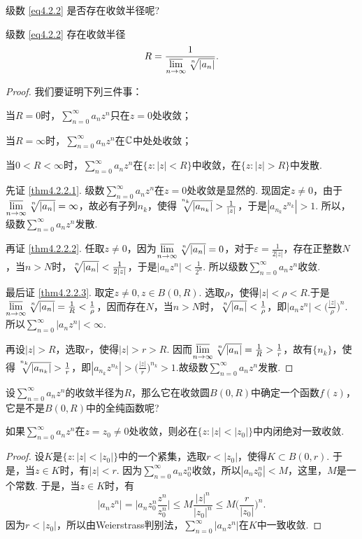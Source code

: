 级数 \eqref{eq4.2.2} 是否存在收敛半径呢?
\begin{theorem}\label{thm4.2.2}
级数  \eqref{eq4.2.2} 存在收敛半径
\[R=\frac1{\varlimsup\limits_{n\to\infty}\sqrt[\leftroot{-1}\uproot{2}n]{|a_n|}}.\]
\end{theorem}
\begin{proof}
我们要证明下列三件事：
\begin{eenum}
  \item \label{thm4.2.2.1}当$R=0$时，$\sum_{n=0}^\infty a_nz^n$只在$z=0$处收敛；
  \item \label{thm4.2.2.2}当$R=\infty$时，$\sum_{n=0}^\infty a_nz^n$在$\mathbb C$中处处收敛；
  \item \label{thm4.2.2.3}当$0<R<\infty$时，$\sum_{n=0}^\infty a_nz^n$在$\{z:|z|<R\}$中收敛，在$\{z:|z|>R\}$中发散.
\end{eenum}

先证 \ref{thm4.2.2.1}. 级数$\sum_{n=0}^\infty a_nz^n$在$z=0$处收敛是显然的. 现固定$z\ne0$，由于$\varlimsup\limits_{n\to\infty}\sqrt[\leftroot{-1}\uproot{2}n]{|a_n|}=\infty$，故必有子列$n_k$，使得$
\sqrt[\leftroot{-3}\uproot{8}n_k]{|a_{n_k}|}>\frac1{|z|}$，于是$|a_{n_k}z^{n_k}|>1$. 所以，级数$\sum_{n=0}^\infty a_nz^n$发散.

再证 \ref{thm4.2.2.2}. 任取$z\ne0$，因为$\varlimsup\limits_ {n\to\infty}\sqrt[\leftroot{-1}\uproot{2}n]{|a_n|}=0$，对于$\varepsilon=\frac1{2|z|}$，存在正整数$N$，当$n>N$时，$\sqrt[\leftroot{-1}\uproot{2}n]{|a_n|}<\frac1{2|z|}$，于是$|a_nz^n|<\frac1{2^n}$. 所以级数$\sum_{n=0}^\infty a_nz^n$收敛.

最后证 \ref{thm4.2.2.3}. 取定$z\ne0,z\in B(0,R)$. 选取$\rho$，使得$|z|<\rho<R$.于是
$\varlimsup\limits_ {n\to\infty}\sqrt[\leftroot{-1}\uproot{2}n]{|a_n|}=\frac1R<\frac1\rho$，因而存在$N$，当$n>N$时，$\sqrt[\leftroot{-1}\uproot{2}n]{|a_n|}<\frac1\rho$，即$|a_nz^n|<\bigg(
\frac{|z|}\rho\bigg)^n$. 所以$\sum_{n=0}^\infty|a_nz^n|<\infty$.

再设$|z|>R$，选取$r$，使得$|z|>r>R$. 因而$\varlimsup\limits_ {n\to\infty}\sqrt[\leftroot{-1}\uproot{2}n]{|a_n|}=\frac1R>\frac1r$，故有$\{n_k\}$，使得$
\sqrt[\leftroot{-3}\uproot{8}n_k]{|a_{n_k}|}>\frac1r$，即$|a_{n_k}z^{n_k}|>\bigg(\frac{|z|}r\bigg)^{n_k}>1$.故级数$\sum_{n=0}^\infty a_nz^n$发散.
\end{proof}

设$\sum_{n=0}^\infty a_nz^n$的收敛半径为$R$，那么它在收敛圆$B(0,R)$中确定一个函数$f(z)$，它是不是$B(0,R)$中的全纯函数呢?
\begin{theorem}\label{thm4.2.3}
如果$\sum_{n=0}^\infty a_nz^n$在$z=z_0\ne0$处收敛，则必在$\{z:|z|<|z_0|\}$中内闭绝对一致收敛.
\end{theorem}
\begin{proof}
设$K$是$\{z:|z|<|z_0|\}$中的一个紧集，选取$r<|z_0|$，使得$K\subset B(0,r)$. 于是，当$z\in K$时，有$|z|<r$. 因为$\sum_{n=0}^\infty a_nz_0^n$收敛，所以$|a_nz_0^n|<M$，这里，$M$是一个常数. 于是，当$z\in K$时，有
\[|a_nz^n|=\bigg|a_nz_0^n\frac{z^n}{z_0^n}\bigg|\le M\frac{|z|^n}{|z_0|^n}\le
M\bigg(\frac r{|z_0|}\bigg)^n.\]
因为$r<|z_0|$，所以由Weierstrass判别法，$\sum_{n=0}^\infty|a_nz^n|$在$K$中一致收敛.
\end{proof}

